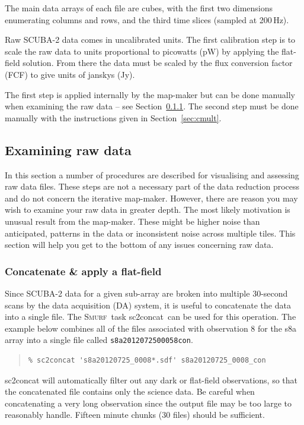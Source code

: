 \documentclass[twoside,11pt]{article}
\newcommand{\xref}[3]{#1}
\newcommand{\xlabel}[1]{}
\renewcommand{\_}{\texttt{\symbol{95}}}
\newenvironment{myquote}{\begin{quote}\begin{small}}{\end{small}\end{quote}}
\newcommand{\smurf}{\xref{\textsc{Smurf}}{sun258}{}}
\newcommand{\task}[1]{\textsf{#1}}
\newcommand{\concat}{\xref{\task{sc2concat}}{sun258}{SC2CONCAT}}
\begin{document}
The main data arrays of each file are cubes, with the first two
dimensions enumerating columns and rows, and the third time slices
(sampled at 200\,Hz).

Raw SCUBA-2 data comes in uncalibrated units. The first calibration
step is to scale the raw data to units proportional to picowatts (pW)
by applying the flat-field solution. From there the data must be
scaled by the flux conversion factor (FCF) to give units of janskys
(Jy).

The first step is applied internally by the map-maker but can be done
manually when examining the raw data -- see Section~\ref{sec:concat}.
The second step must be done manually with the instructions given in
Section~\ref{sec:cmult}.


\subsection{\xlabel{examine}Examining raw data}
\label{sec:exam}

In this section a number of procedures are described for visualising
and assessing raw data files.  These steps are not a necessary part of
the data reduction process and do not concern the iterative map-maker.
However, there are reason you may wish to examine your raw data in
greater depth. The most likely motivation is unusual result from the
map-maker. These might be higher noise than anticipated, patterns in
the data or inconsistent noise across multiple tiles. This section
will help you get to the bottom of any issues concerning raw data.

\subsubsection{\xlabel{concat}Concatenate \& apply a flat-field}
\label{sec:concat}

Since SCUBA-2 data for a given sub-array are broken into multiple
30-second scans by the data acquisition (DA) system, it is useful to
concatenate the data into a single file. The \smurf\ task \concat\ can
be used for this operation. The example below combines all of the
files associated with observation 8 for the s8a array into a single
file called \texttt{s8a20120725\_00058\_con}.

\begin{myquote}
\begin{verbatim}
% sc2concat 's8a20120725_0008*.sdf' s8a20120725_0008_con
\end{verbatim}
\end{myquote}
\task{sc2concat} will automatically filter out any dark or flat-field
observations, so that the concatenated file contains only the science
data. Be careful when concatenating a very long observation since the
output file may be too large to reasonably handle. Fifteen minute
chunks (30 files) should be sufficient.
\end{document}
